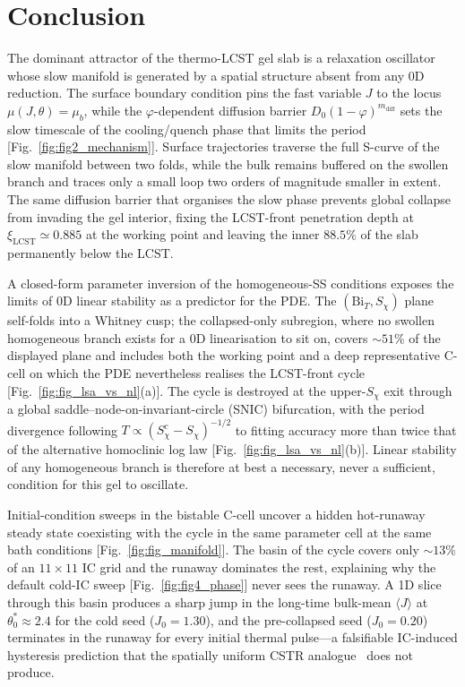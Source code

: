\documentclass[aps,pre,reprint,superscriptaddress,longbibliography,floatfix]{revtex4-2}
\newcommand{\Bi}{\mathrm{Bi}}
\begin{document}
\section{Conclusion}
\label{sec:conclusion}

The dominant attractor of the thermo-LCST gel slab is a relaxation
oscillator whose slow manifold is generated by a spatial structure
absent from any 0D reduction. The surface boundary condition pins the
fast variable $J$ to the locus $\mu(J,\theta)\!=\!\mu_b$, while the
$\varphi$-dependent diffusion barrier $D_0(1-\varphi)^{m_\mathrm{diff}}$
sets the slow timescale of the cooling/quench phase that limits the
period [Fig.~\ref{fig:fig2_mechanism}]. Surface trajectories traverse
the full S-curve of the slow manifold between two folds, while the
bulk remains buffered on the swollen branch and traces only a small
loop two orders of magnitude smaller in extent. The same diffusion
barrier that organises the slow phase prevents global collapse from
invading the gel interior, fixing the LCST-front penetration depth at
$\xi_\mathrm{LCST}\!\simeq\!0.885$ at the working point and leaving
the inner $88.5\%$ of the slab permanently below the LCST.

A closed-form parameter inversion of the homogeneous-SS conditions
exposes the limits of 0D linear stability as a predictor for the PDE.
The $(\Bi_T,S_\chi)$ plane self-folds into a Whitney cusp; the
collapsed-only subregion, where no swollen homogeneous branch exists
for a 0D linearisation to sit on, covers $\sim\!51\%$ of the
displayed plane and includes both the working point and a deep
representative C-cell on which the PDE nevertheless realises the
LCST-front cycle [Fig.~\ref{fig:fig_lsa_vs_nl}(a)]. The cycle is
destroyed at the upper-$S_\chi$ exit through a global
saddle--node-on-invariant-circle (SNIC) bifurcation, with the period
divergence following $T\!\propto\!(S_\chi^c\!-\!S_\chi)^{-1/2}$ to
fitting accuracy more than twice that of the alternative homoclinic
log law [Fig.~\ref{fig:fig_lsa_vs_nl}(b)]. Linear stability of any
homogeneous branch is therefore at best a necessary, never a
sufficient, condition for this gel to oscillate.

Initial-condition sweeps in the bistable C-cell uncover a hidden
hot-runaway steady state coexisting with the cycle in the same
parameter cell at the same bath conditions
[Fig.~\ref{fig:fig_manifold}]. The basin of the cycle covers only
$\sim\!13\%$ of an $11\!\times\!11$ IC grid and the runaway dominates
the rest, explaining why the default cold-IC sweep
[Fig.~\ref{fig:fig4_phase}] never sees the runaway. A 1D slice
through this basin produces a sharp jump in the long-time bulk-mean
$\langle J\rangle$ at $\theta_0^{\!*}\!\approx\!2.4$ for the cold seed
($J_0=1.30$), and the pre-collapsed seed ($J_0=0.20$) terminates in
the runaway for every initial thermal pulse---a falsifiable IC-induced
hysteresis prediction that the spatially uniform CSTR
analogue~\cite{Uppal1974} does not produce.
\end{document}
